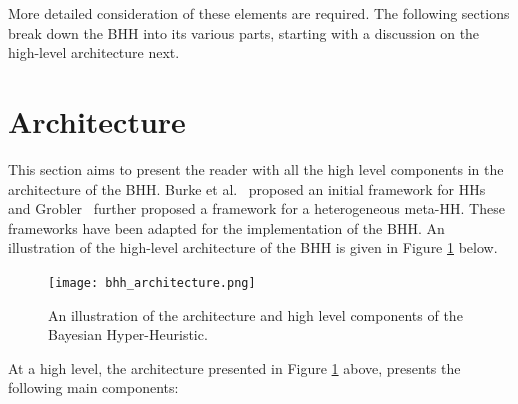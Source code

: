 More detailed consideration of these elements are required. The following sections break down the \Ac{BHH} into its various parts, starting with a discussion on the high-level architecture next.


\section{Architecture}
\label{sec:bhh:architecture}

This section aims to present the reader with all the high level components in the architecture of the \Ac{BHH}. Burke et al.~\cite{ref:burke:2010} proposed an initial framework for \acp{HH} and Grobler~\cite{ref:grobler:2015} further proposed a framework for a heterogeneous meta-\ac{HH}. These frameworks have been adapted for the implementation of the \Ac{BHH}. An illustration of the high-level architecture of the \Ac{BHH} is given in Figure \ref{fig:bhh_architecture} below.

\begin{figure}[H]
      \centering
      \texttt{[image: bhh\_architecture.png]}
      \caption[The Bayesian Hyper-Heuristic Architecture]{An illustration of
            the architecture and high level components of the Bayesian Hyper-Heuristic.}
      \label{fig:bhh_architecture}
\end{figure}

At a high level, the architecture presented in Figure \ref{fig:bhh_architecture} above, presents the following main components:

